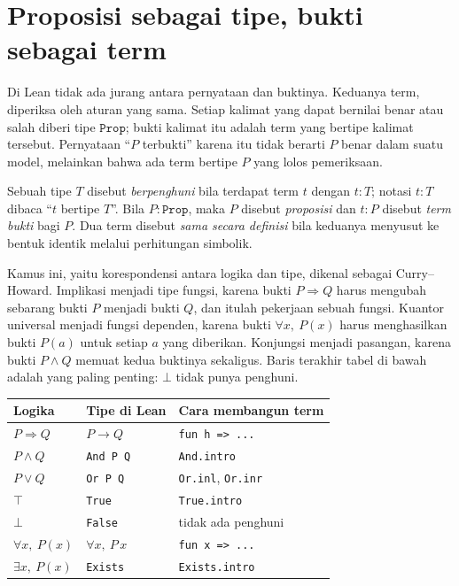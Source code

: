 \section{Proposisi sebagai tipe, bukti sebagai term}


Di Lean tidak ada jurang antara pernyataan dan buktinya. Keduanya term, diperiksa oleh aturan yang
sama. Setiap kalimat yang dapat bernilai benar atau salah diberi tipe $\mathtt{Prop}$; bukti
kalimat itu adalah term yang bertipe kalimat tersebut. Pernyataan ``$P$ terbukti'' karena itu
tidak berarti $P$ benar dalam suatu model, melainkan bahwa ada term bertipe $P$ yang lolos
pemeriksaan.


\begin{definisi}
Sebuah tipe $T$ disebut \emph{berpenghuni} bila terdapat term $t$ dengan $t:T$; notasi $t:T$
dibaca ``$t$ bertipe $T$''. Bila $P:\mathtt{Prop}$, maka $P$ disebut \emph{proposisi} dan $t:P$
disebut \emph{term bukti} bagi $P$. Dua term disebut \emph{sama secara definisi} bila keduanya
menyusut ke bentuk identik melalui perhitungan simbolik.
\end{definisi}

Kamus ini, yaitu korespondensi antara logika dan tipe, dikenal sebagai Curry--Howard. Implikasi
menjadi tipe fungsi, karena bukti $P\Rightarrow Q$ harus mengubah sebarang bukti $P$ menjadi bukti
$Q$, dan itulah pekerjaan sebuah fungsi. Kuantor universal menjadi fungsi dependen, karena bukti
$\forall x,\ P(x)$ harus menghasilkan bukti $P(a)$ untuk setiap $a$ yang diberikan. Konjungsi
menjadi pasangan, karena bukti $P\wedge Q$ memuat kedua buktinya sekaligus. Baris terakhir tabel
di bawah adalah yang paling penting: $\bot$ tidak punya penghuni.

\begin{center}
\begin{tabular}{lll}
\hline
Logika & Tipe di Lean & Cara membangun term \\
\hline
$P\Rightarrow Q$   & $P\to Q$              & \texttt{fun h => ...} \\
$P\wedge Q$        & \texttt{And P Q}      & \texttt{And.intro} \\
$P\vee Q$          & \texttt{Or P Q}       & \texttt{Or.inl}, \texttt{Or.inr} \\
$\top$             & \texttt{True}         & \texttt{True.intro} \\
$\bot$             & \texttt{False}        & tidak ada penghuni \\
$\forall x,\ P(x)$ & $\forall x,\ P\,x$    & \texttt{fun x => ...} \\
$\exists x,\ P(x)$ & \texttt{Exists}       & \texttt{Exists.intro} \\
\hline
\end{tabular}
\end{center}

